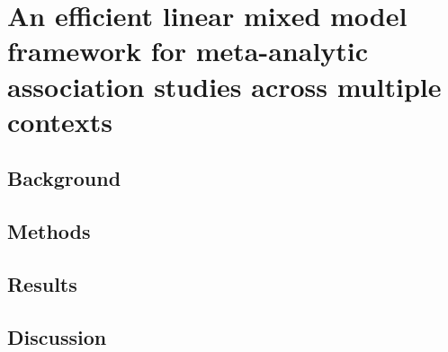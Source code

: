 \chapter{An efficient linear mixed model framework for meta-analytic association studies across multiple contexts}
\section{Background}
\section{Methods}
\section{Results}
\section{Discussion}